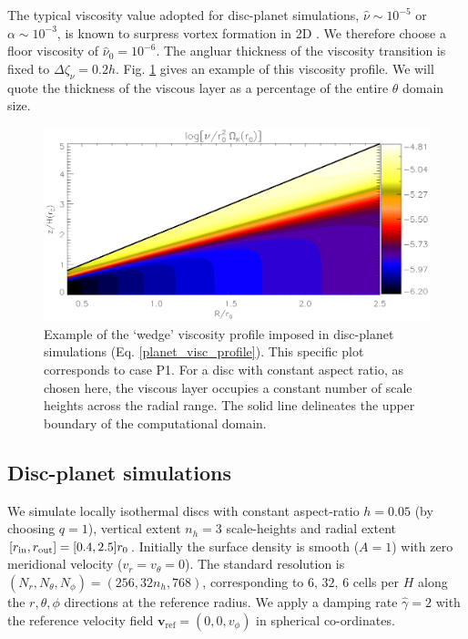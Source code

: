 The typical viscosity value adopted for disc-planet simulations, 
$\hat{\nu}\sim 10^{-5}$ or $\alpha\sim 10^{-3}$, is known to surpress
vortex formation in 2D \citep{valborro07, mudryk09}. 
We therefore choose a floor viscosity of $\hat{\nu}_0=10^{-6}$.
The angluar thickness of the viscosity transition is fixed to
$\Delta\zeta_\nu = 0.2h$. Fig. \ref{planet_visc2d} gives an example of this
viscosity profile. We will quote the thickness of the viscous layer as a 
percentage of the entire $\theta$ domain size. 

\begin{figure}
  \centering
  \includegraphics[width=\linewidth]{figures/pdisk_visc2d_planet}
  \caption{Example of the `wedge' viscosity profile
    imposed in disc-planet simulations
    (Eq. \ref{planet_visc_profile}). 
    This specific plot corresponds to case P1. 
    For a disc with constant aspect ratio, as chosen here, the viscous
    layer occupies a constant number of scale heights across the
    radial range. 
    The solid line
    delineates the upper boundary of the computational domain.
    \label{planet_visc2d}}
\end{figure}


\subsection{Disc-planet simulations} 
We simulate locally isothermal discs with constant aspect-ratio
$h=0.05$ (by choosing $q=1$), vertical extent $n_h=3$ scale-heights 
and radial extent $[r_\mathrm{in},r_\mathrm{out}]=[0.4,2.5]r_0$. Initially the surface density is smooth
($A=1$) with zero meridional velocity ($v_r=v_\theta=0$). 
The standard resolution is $(N_r, N_\theta,
N_\phi)=(256, 32n_h, 768)$, corresponding to $6,\,32,\,6$ 
cells per $H$ along the $r,\theta,\phi$ directions at the reference
radius. We apply a damping rate $\hat{\gamma}=2$ with the reference
velocity field $\bm{v}_\mathrm{ref}=(0,0,v_\phi)$ in spherical
co-ordinates.   

